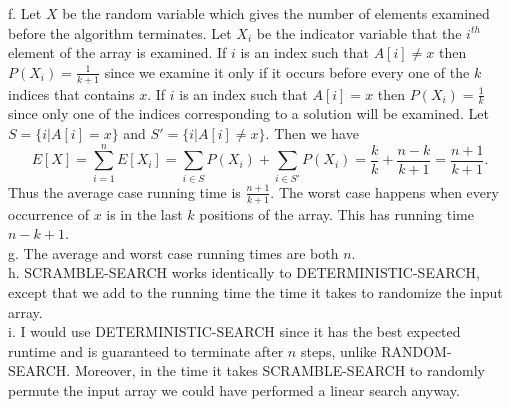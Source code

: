 \documentclass{article}
\begin{document}
f. Let $X$ be the random variable which gives the number of elements examined before the algorithm terminates.  Let $X_i$ be the indicator variable that the $i^{th}$ element of the array is examined.  If $i$ is an index such that $A[i] \neq x$ then $P(X_i) = \frac{1}{k+1}$ since we examine it only if it occurs before every one of the $k$ indices that contains $x$.  If $i$ is an index such that $A[i] = x$ then $P(X_i) = \frac{1}{k}$ since only one of the indices corresponding to a solution will be examined.  Let $S = \{i | A[i] = x\}$ and $S' = \{i | A[i] \neq x\}$.  Then we have
\[E[X] = \sum_{i=1}^n E[X_i] = \sum_{i \in S} P(X_i) + \sum_{i \in S'}P(X_i) = \frac{k}{k} + \frac{n-k}{k+1} = \frac{n+1}{k+1}.\]
Thus the average case running time is $\frac{n+1}{k+1}$.  The worst case happens when every occurrence of $x$ is in the last $k$ positions of the array.  This has running time $n-k+1$.\\

g. The average and worst case running times are both $n$. \\

h. SCRAMBLE-SEARCH works identically to DETERMINISTIC-SEARCH, except that we add to the running time the time it takes to randomize the input array. \\

i. I would use DETERMINISTIC-SEARCH since it has the best expected runtime and is guaranteed to terminate after $n$ steps, unlike RANDOM-SEARCH.  Moreover, in the time it takes SCRAMBLE-SEARCH to randomly permute the input array we could have performed a linear search anyway.
\end{document}
